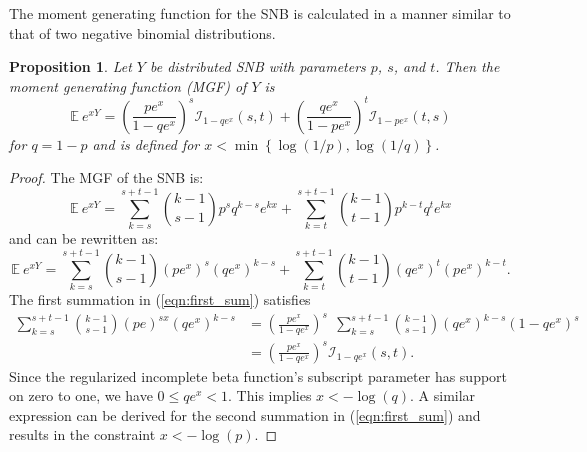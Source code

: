 \documentclass[review]{elsarticle}
\newtheorem{prop}{Proposition}
\begin{document}
The moment generating function for the SNB is calculated in a manner similar to 
that of two negative binomial distributions. 
\begin{prop} Let $Y$ be distributed SNB with parameters $p$, $s$, and $t$.
Then the moment generating function (MGF) of $Y$ is
\begin{equation} \label{eqn:mgf}
\mathbb{E}~e^{xY} = \left(\frac{p e^x}{1 - qe^x}\right)^s 
  \mathcal{I}_{1-qe^x} (s, t) + \left(\frac{qe^x}{1-pe^x}\right)^t 
  \mathcal{I}_{1-pe^x}(t, s)
\end{equation}
for $q = 1-p$ and is defined for 
$x < \min \left\{\log(1/p), \log(1/q) \right\}$.
\end{prop}
\begin{proof}
The MGF of the SNB is:
\begin{equation*}
\mathbb{E}~e^{xY} = \sum_{k=s}^{s+t-1} {k-1 \choose s-1} p^s q^{k-s} e^{kx} 
  + \sum_{k=t}^{s+t-1} {k-1 \choose t-1} p^{k-t} q^t e^{kx}
\end{equation*}
and can be rewritten as:
\begin{equation} \label{eqn:first_sum}
\mathbb{E}~e^{xY} = \sum_{k=s}^{s+t-1}{k-1 \choose s-1} (pe^x)^{s} (qe^x)^{k-s} 
  + \sum_{k=t}^{s+t-1}{k-1 \choose t-1} (qe^x)^t (pe^x)^{k-t}.
\end{equation}
The first summation in (\ref{eqn:first_sum}) satisfies
\begin{align*}
\sum_{k=s}^{s+t-1}{k-1 \choose s-1} (pe)^{sx} (qe^x)^{k-s} &= 
  \left(\frac{pe^x}{1 - qe^x}\right)^s \ \ \sum_{k=s}^{s+t-1} {k-1 \choose s-1} 
    (qe^x)^{k-s} (1-qe^x)^s \\
  &= \left(\frac{pe^x}{1 - qe^x}\right)^s \mathcal{I}_{1-qe^x}(s, t).
\end{align*}
Since the regularized incomplete beta function's subscript parameter 
has support on zero 
to one, we have $0 \leq qe^x < 1$. This implies
$x < -\log(q)$.
A similar expression can be derived for the second summation in 
(\ref{eqn:first_sum}) and results in
the constraint $x < -\log(p)$.
\end{proof}
\end{document}
